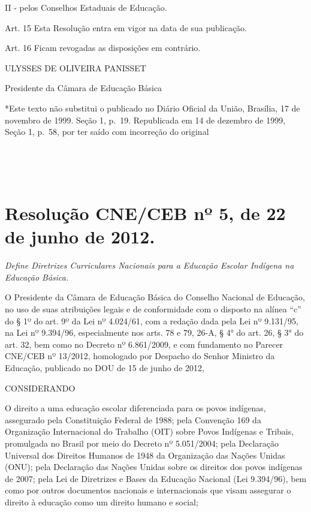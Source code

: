 \documentclass[
]{book}
\begin{document}
II - pelos Conselhos Estaduais de Educação.

Art. 15 Esta Resolução entra em vigor na data de sua publicação.

Art. 16 Ficam revogadas as disposições em contrário.

ULYSSES DE OLIVEIRA PANISSET

Presidente da Câmara de Educação Básica

*Este texto não substitui o publicado no Diário Oficial da União, Brasília, 17 de novembro de 1999. Seção 1, p.~19. Republicada em 14 de dezembro de 1999, Seção 1, p.~58, por ter saído com incorreção do original

~

~

\hypertarget{resoluuxe7uxe3o-cneceb-nuxba-5-de-22-de-junho-de-2012.}{%
\section{Resolução CNE/CEB nº 5, de 22 de junho de 2012.}\label{resoluuxe7uxe3o-cneceb-nuxba-5-de-22-de-junho-de-2012.}}

\emph{Define Diretrizes Curriculares Nacionais para a Educação Escolar Indígena na Educação Básica.}

O Presidente da Câmara de Educação Básica do Conselho Nacional de Educação, no uso de suas atribuições legais e de conformidade com o disposto na alínea ``c'' do § 1º do art. 9º da Lei nº 4.024/61, com a redação dada pela Lei nº 9.131/95, na Lei nº 9.394/96, especialmente nos arts. 78 e 79, 26-A, § 4° do art. 26, § 3° do art. 32, bem como no Decreto nº 6.861/2009, e com fundamento no Parecer CNE/CEB nº 13/2012, homologado por Despacho do Senhor Ministro da Educação, publicado no DOU de 15 de junho de 2012,

CONSIDERANDO

O direito a uma educação escolar diferenciada para os povos indígenas, assegurado pela Constituição Federal de 1988; pela Convenção 169 da Organização Internacional do Trabalho (OIT) sobre Povos Indígenas e Tribais, promulgada no Brasil por meio do Decreto nº 5.051/2004; pela Declaração Universal dos Direitos Humanos de 1948 da Organização das Nações Unidas (ONU); pela Declaração das Nações Unidas sobre os direitos dos povos indígenas de 2007; pela Lei de Diretrizes e Bases da Educação Nacional (Lei 9.394/96), bem como por outros documentos nacionais e internacionais que visam assegurar o direito à educação como um direito humano e social;
\end{document}
